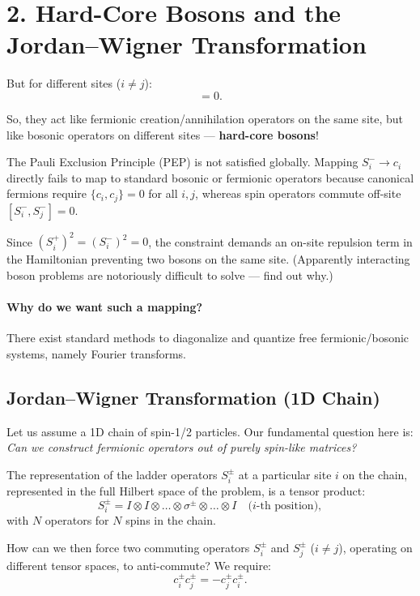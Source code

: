 \documentclass[11pt,a4paper]{article}
\begin{document}
\section*{2. Hard-Core Bosons and the Jordan--Wigner Transformation}

But for different sites ($i \neq j$):
\begin{equation}
    [S_i^+, S_j^-] = 0.
\end{equation}

So, they act like fermionic creation/annihilation operators on the same site, but like bosonic operators on different sites --- \textbf{hard-core bosons}!

The Pauli Exclusion Principle (PEP) is not satisfied globally. Mapping $S_i^- \to c_i$ directly fails to map to standard bosonic or fermionic operators because canonical fermions require $\{c_i, c_j\} = 0$ for all $i, j$, whereas spin operators commute off-site $[S_i^-, S_j^-] = 0$.

Since $(S_i^+)^2 = (S_i^-)^2 = 0$, the constraint demands an on-site repulsion term in the Hamiltonian preventing two bosons on the same site. (Apparently interacting boson problems are notoriously difficult to solve --- find out why.)

\paragraph{Why do we want such a mapping?}
There exist standard methods to diagonalize and quantize free fermionic/bosonic systems, namely Fourier transforms.

\subsection*{Jordan--Wigner Transformation (1D Chain)}
Let us assume a 1D chain of spin-1/2 particles. Our fundamental question here is: \emph{Can we construct fermionic operators out of purely spin-like matrices?}

The representation of the ladder operators $S_i^\pm$ at a particular site $i$ on the chain, represented in the full Hilbert space of the problem, is a tensor product:
\begin{equation}
    S_i^\pm = I \otimes I \otimes \dots \otimes \sigma^\pm \otimes \dots \otimes I \quad \text{($i$-th position)},
\end{equation}
with $N$ operators for $N$ spins in the chain.

How can we then force two commuting operators $S_i^\pm$ and $S_j^\pm$ ($i \neq j$), operating on different tensor spaces, to anti-commute?
We require:
\begin{equation}
    c_i^\pm c_j^\pm = - c_j^\pm c_i^\pm.
\end{equation}
\end{document}
